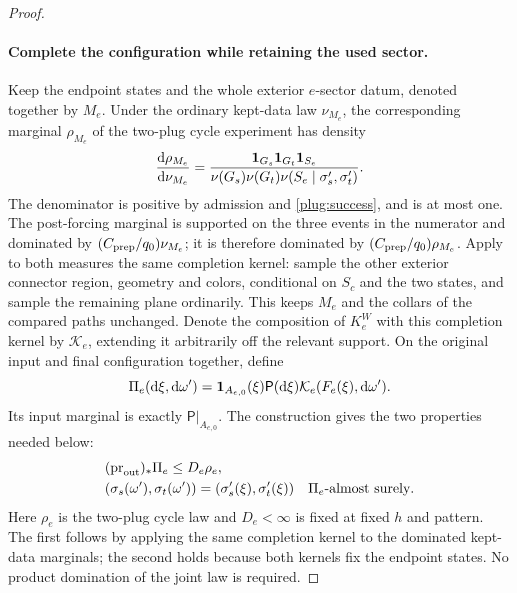 \begin{proof}
\paragraph{Complete the configuration while retaining the used sector.}
Keep the endpoint states and the whole exterior $e$-sector datum,
denoted together by $M_e$.  Under the ordinary kept-data law
$\nu_{M_e}$, the corresponding marginal $\rho_{M_e}$ of the
two-plug cycle experiment has density
\begin{equation}\label{actual:cycle-density}
 \frac{\mathrm d\rho_{M_e}}{\mathrm d\nu_{M_e}}
 =\frac{\mathbf 1_{G_s}\mathbf 1_{G_t}\mathbf 1_{S_e}}
 {\nu(G_s)\nu(G_t)\nu(S_e\mid\sigma'_s,\sigma'_t)}.
\end{equation}
The denominator is positive by admission and \eqref{plug:success},
and is at most one.  The post-forcing marginal is supported on the
three events in the numerator and dominated by
$(C_{\rm prep}/q_0)\nu_{M_e}$; it is therefore dominated by
$(C_{\rm prep}/q_0)\rho_{M_e}$.  Apply to both
measures the same completion kernel: sample the other exterior
connector region, geometry and colors, conditional on $S_c$ and the
two states, and sample the remaining plane ordinarily.  This keeps
$M_e$ and the collars of the compared paths unchanged.  Denote the
composition of $K_e^W$ with this completion kernel by $\mathcal K_e$,
extending it arbitrarily off the relevant support.  On the original
input and final configuration together, define
\[
 \Pi_e(\mathrm d\xi,\mathrm d\omega')
   =\mathbf 1_{A_{e,0}}(\xi)\mathsf P(\mathrm d\xi)
             \mathcal K_e(F_e(\xi),\mathrm d\omega').
\]
Its input marginal is exactly $\mathsf P|_{A_{e,0}}$.  The construction
gives the two properties needed below:
\[
 \begin{aligned}
 &(\operatorname{pr}_{\rm out})_*\Pi_e\le D_e\rho_e,\\
 &(\sigma_s(\omega'),\sigma_t(\omega'))
       =(\sigma'_s(\xi),\sigma'_t(\xi))
       \quad\Pi_e\text{-almost surely}.
 \end{aligned}
\]
Here $\rho_e$ is the two-plug cycle law and $D_e<\infty$ is fixed
at fixed $h$ and pattern.  The first follows by applying the same
completion kernel to the dominated kept-data marginals; the second
holds because both kernels fix the endpoint states.  No product
domination of the joint law is required.


\end{proof}
